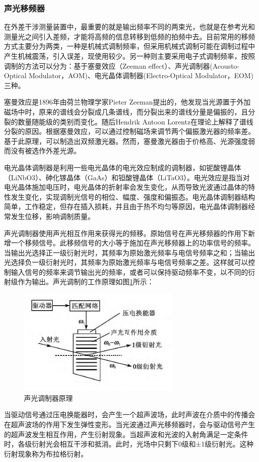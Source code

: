 \documentclass[type=master,oneside]{fduthesis}
\begin{document}
\subsubsection{声光移频器}
在外差干涉测量装置中，最重要的就是输出频率不同的两束光，也就是在参考光和测量光之间引入差频，才能将高频的信息转移到低频的拍频中去。目前常用的移频方式主要分为两类，一种是机械式调制频率，但采用机械式调制可能在调制过程中产生机械震荡，引入误差，现使用较少。另一种则主要采用电子式调制频率，按照调制的方法可以分为：基于塞曼效应（Zeeman effect）、声光调制器(Acousto-Optical Modulator，AOM)、电光晶体调制器(Electro-Optical Modulator，EOM)三种。

塞曼效应\cite{thalau2006magnetic,preston1898radiation}是1896年由荷兰物理学家Pieter Zeeman提出的，他发现当光源置于外加磁场中时，原来的谱线会分裂成几条谱线，而分裂出来的谱线分量是偏振的，且分裂的数量随能级的类别而变化。随后Hendrik Antoon Lorentz在理论上解释了谱线分裂的原因\cite{sargent1967theory}。根据塞曼效应，可以通过控制磁场来调节两个偏振激光器的频率差。基于此原理，可以制造出双频激光器\cite{rong2003frequency}。然而，塞曼激光器由于价格高、光源强度弱而没有被选作外差光源。

电光晶体调制器\cite{李洪祚2008电光调制器}是利用一些电光晶体的电光效应制成的调制器，如铌酸锂晶体（LiNbO3）、砷化镓晶体（GaAs）和钽酸锂晶体（LiTaO3）。电光效应是指当对电光晶体施加电压时，电光晶体的折射率会发生变化，从而导致光波通过晶体的特性发生变化，实现调制光信号的相位、幅度、强度和偏振态。电光晶体调制器结构简单，工作稳定，但存在插入损耗，并且由于热不均匀等原因，电光晶体调制器经常发生位移，影响调制质量。

声光调制器\cite{尚建华2012基于双声光移频器的外差式激光多普勒测振计,郭力仁2015声光移频器对微多普勒效应探测的影响研究}使用声光相互作用来获得光的频移。原始信号在声光移频器的作用下新增一个移频信号。此移频信号的大小等于施加在声光移频器上的功率信号的频率。当输出光选择正一级衍射光时，其频率为原始激光频率与电信号频率之和；当输出光选择负一级衍射光时，其频率为原始激光频率与电信号频率之差。这样就可以控制输入信号的频率来调节输出光的频率，或者可以保持驱动频率不变，以不同的衍射级作为输出。声光调制的工作原理如图\ref{fig:声光调制器原理}所示：
\begin{figure}[H]
  \centering
  \includegraphics[width=0.7\textwidth]{3-fig//声光调制器原理.jpg}
  \caption{声光调制器原理}
  \label{fig:声光调制器原理}
\end{figure}
当驱动信号通过压电换能器时，会产生一个超声波场，此时声波在介质中的传播会在超声波场的作用下发生弹性变形。当光波通过声光移频器时，会与驱动信号产生的超声波发生相互作用，产生衍射现象。当超声波和光波的入射角满足一定条件时，各级衍射光会相互干涉和抵消。此时，光场中只剩下0级和±1级衍射光。这种衍射现象称为布拉格衍射。
\end{document}
